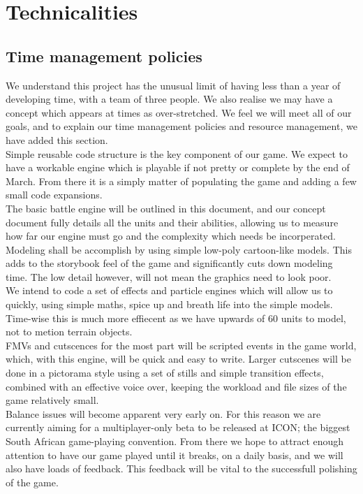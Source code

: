 \documentclass[a4paper]{article}
\begin{document}
\newpage \section{Technicalities}

\subsection{Time management policies}

We understand this project has the unusual limit of having less than a year of developing time, with a team of three people. We also realise we may have a concept which appears at times as over-stretched. We feel we will meet all of our goals, and to explain our time management policies and resource management, we have added this section.\\

Simple reusable code structure is the key component of our game. We expect to have a workable engine which is playable if not pretty or complete by the end of March. From there it is a simply matter of populating the game and adding a few small code expansions.\\
The basic battle engine will be outlined in this document, and our concept document fully details all the units and their abilities, allowing us to measure how far our engine must go and the complexity which needs be incorperated.\\

Modeling shall be accomplish by using simple low-poly cartoon-like models. This adds to the storybook feel of the game and significantly cuts down modeling time. The low detail however, will not mean the graphics need to look poor.\\
We intend to code a set of effects and particle engines which will allow us to quickly, using simple maths, spice up and breath life into the simple models. Time-wise this is much more effiecent as we have upwards of 60 units to model, not to metion terrain objects.\\

FMVs and cutscences for the most part will be scripted events in the game world, which, with this engine, will be quick and easy to write. Larger cutscenes will be done in a pictorama style using a set of stills and simple transition effects, combined with an effective voice over, keeping the workload and file sizes of the game relatively small.\\

Balance issues will become apparent very early on. For this reason we are currently aiming for a multiplayer-only beta to be released at ICON; the biggest South African game-playing convention. From there we hope to attract enough attention to have our game played until it breaks, on a daily basis, and we will also have loads of feedback. This feedback will be vital to the successfull polishing of the game.\\
\end{document}
